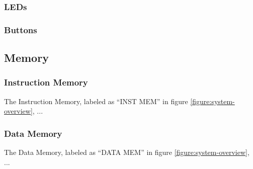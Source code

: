 \subsubsection{LEDs}


\subsubsection{Buttons}


\subsection{Memory}

\subsubsection{Instruction Memory}

The Instruction Memory, labeled as ``INST MEM'' in figure \vref{figure:system-overview}, ...

\subsubsection{Data Memory}

The Data Memory, labeled as ``DATA MEM'' in figure \vref{figure:system-overview}, ...

